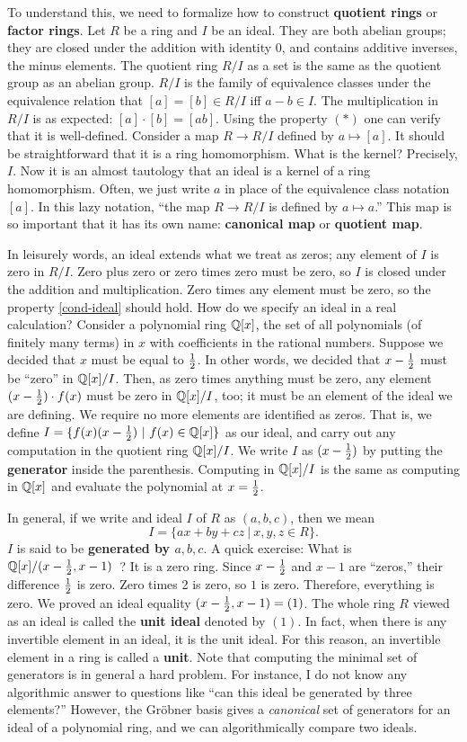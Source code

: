 To understand this, we need to formalize how to construct {\bf quotient rings} or {\bf factor rings}.
Let $R$ be a ring and $I$ be an ideal.
They are both abelian groups; they are closed under the addition with identity $0$,
and contains additive inverses, the minus elements.
The quotient ring $R/I$ as a set is the same as the quotient group as an abelian group.
$R/I$ is the family of equivalence classes under the equivalence relation that
$[a] = [b] \in R/I$ iff $a-b \in I$.
The multiplication in $R/I$ is as expected: $[a] \cdot [b] = [ab]$.
Using the property $(*)$ one can verify that it is well-defined.
Consider a map $R \to R/I$ defined by $a \mapsto [a]$.
It should be straightforward that it is a ring homomorphism.
What is the kernel? Precisely, $I$.
Now it is an almost tautology that an ideal is a kernel of a ring homomorphism.
Often, we just write $a$ in place of the equivalence class notation $[a]$.
In this lazy notation, ``the map $R \to R/I$ is defined by $a \mapsto a$.''
This map is so important that it has its own name: {\bf canonical map} or {\bf quotient map}.


In leisurely words, an ideal extends what we treat as zeros;
any element of $I$ is zero in $R/I$.
Zero plus zero or zero times zero must be zero, so $I$ is closed under the addition and multiplication.
Zero times any element must be zero, so the property \eqref{cond-ideal} should hold.
How do we specify an ideal in a real calculation?
Consider a polynomial ring $\mathbb{Q}[x]$, the set of all polynomials (of finitely many terms) in $x$ with coefficients in the rational numbers.
Suppose we decided that $x$ must be equal to $\frac{1}{2}$.
In other words, we decided that $x - \frac{1}{2}$ must be ``zero'' in $\mathbb{Q}[x]/I$.
Then, as zero times anything must be zero, any element $(x-\frac{1}{2})\cdot f(x)$ must be zero in $\mathbb{Q}[x]/I$, too;
it must be an element of the ideal we are defining.
We require no more elements are identified as zeros.
That is, we define $I = \{ f(x)(x-\frac{1}{2}) ~|~ f(x) \in \mathbb{Q}[x] \}$ as our ideal,
and carry out any computation in the quotient ring $\mathbb{Q}[x]/I$.
We write $I$ as $(x-\frac{1}{2})$ by putting the {\bf generator} inside the parenthesis.
Computing in $\mathbb{Q}[x]/I$ is the same as computing in $\mathbb{Q}[x]$ and evaluate the polynomial at $x=\frac{1}{2}$.


In general, if we write and ideal $I$ of $R$ as $(a,b,c)$,
then we mean
\[
 I = \{ ax + by + cz ~|~ x,y,z \in R \} .
\]
$I$ is said to be {\bf generated by $a,b,c$}.
A quick exercise: What is $\mathbb{Q}[x]/(x-\frac{1}{2}, x-1)$~? It is a zero ring.
Since $x-\frac{1}{2}$ and $x-1$ are ``zeros,'' their difference $\frac{1}{2}$ is zero.
Zero times 2 is zero, so $1$ is zero. Therefore, everything is zero.
We proved an ideal equality $(x-\frac{1}{2}, x-1) = (1)$.
The whole ring $R$ viewed as an ideal is called the {\bf unit ideal} denoted by $(1)$.
In fact, when there is any invertible element in an ideal, it is the unit ideal.
For this reason, an invertible element in a ring is called a {\bf unit}.
Note that computing the minimal set of generators is in general a hard problem.
For instance, I do not know any algorithmic answer to questions like ``can this ideal be generated by three elements?''
However, the Gr\"obner basis gives a \emph{canonical} set of generators for an ideal of a polynomial ring,
and we can algorithmically compare two ideals.


